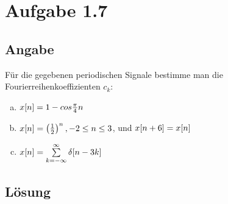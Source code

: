 \section*{Aufgabe 1.7}
\subsection*{Angabe}
Für die gegebenen periodischen Signale bestimme man die Fourierreihenkoeffizienten $c_k$:
\begin{enumerate}[a)]
	\item $x\negthinspace\left[n\right]=1-cos\frac{\pi}{4}n$
	\item $x\negthinspace\left[n\right]=\left(\frac{1}{2}\right)^n, -2\le n\le 3$, und $x\negthinspace\left[n+6\right]=x\negthinspace\left[n\right]$
	\item $x\negthinspace\left[n\right]=\sum\limits_{k=-\infty}^{\infty}\delta \negthinspace\left[n-3k\right]$
\end{enumerate}
\subsection*{Lösung}
